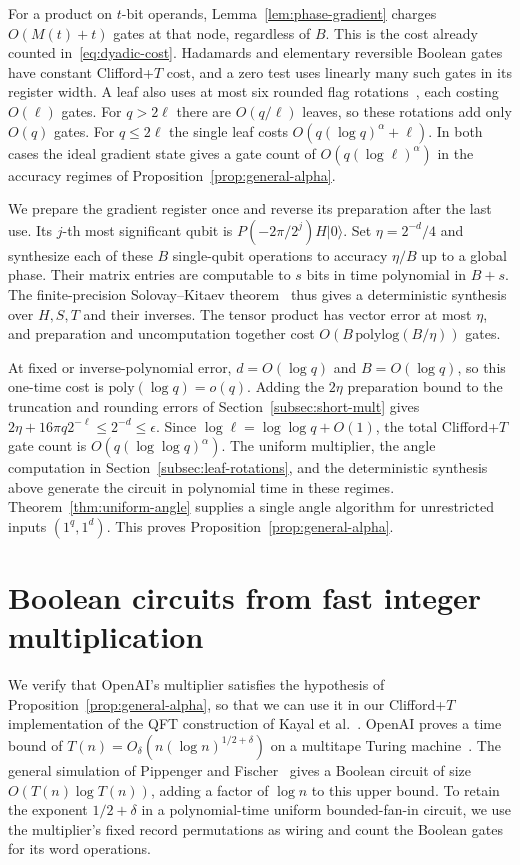 \documentclass[11pt]{article}
\newcommand{\CFT}{Clifford+$T$}
\begin{document}
For a product on $t$-bit operands, Lemma~\ref{lem:phase-gradient} charges $O(M(t)+t)$ gates at that node, regardless of $B$. This is the cost already counted in~\eqref{eq:dyadic-cost}. Hadamards and elementary reversible Boolean gates have constant \CFT{} cost, and a zero test uses linearly many such gates in its register width. A leaf also uses at most six rounded flag rotations~\cite[Section~4.2]{kmps2026}, each costing $O(\ell)$ gates. For $q>2\ell$ there are $O(q/\ell)$ leaves, so these rotations add only $O(q)$ gates. For $q\le 2\ell$ the single leaf costs $O(q(\log q)^\alpha+\ell)$. In both cases the ideal gradient state gives a gate count of $O(q(\log\ell)^\alpha)$ in the accuracy regimes of Proposition~\ref{prop:general-alpha}.

We prepare the gradient register once and reverse its preparation after the last use. Its $j$-th most significant qubit is $P(-2\pi/2^j)H|0\rangle$. Set $\eta=2^{-d}/4$ and synthesize each of these $B$ single-qubit operations to accuracy $\eta/B$ up to a global phase. Their matrix entries are computable to $s$ bits in time polynomial in $B+s$. The finite-precision Solovay--Kitaev theorem~\cite[Theorem~4.3]{vmw2012} thus gives a deterministic synthesis over $H,S,T$ and their inverses. The tensor product has vector error at most $\eta$, and preparation and uncomputation together cost $O(B\,\mathrm{polylog}(B/\eta))$ gates.

At fixed or inverse-polynomial error, $d=O(\log q)$ and $B=O(\log q)$, so this one-time cost is $\mathrm{poly}(\log q)=o(q)$. Adding the $2\eta$ preparation bound to the truncation and rounding errors of Section~\ref{subsec:short-mult} gives $2\eta+16\pi q2^{-\ell}\le 2^{-d}\le\epsilon$. Since $\log\ell=\log\log q+O(1)$, the total \CFT{} gate count is $O(q(\log\log q)^\alpha)$. The uniform multiplier, the angle computation in Section~\ref{subsec:leaf-rotations}, and the deterministic synthesis above generate the circuit in polynomial time in these regimes. Theorem~\ref{thm:uniform-angle} supplies a single angle algorithm for unrestricted inputs $(1^q,1^d)$. This proves Proposition~\ref{prop:general-alpha}.

\section{Boolean circuits from fast integer multiplication}\label{sec:boolean-mult}

We verify that OpenAI's multiplier satisfies the hypothesis of Proposition~\ref{prop:general-alpha}, so that we can use it in our \CFT{} implementation of the QFT construction of Kayal et al.~\cite{kmps2026}. OpenAI proves a time bound of $T(n)=O_\delta(n(\log n)^{1/2+\delta})$ on a multitape Turing machine~\cite[Theorem~5.1]{openai2026mult}. The general simulation of Pippenger and Fischer~\cite{pf1979} gives a Boolean circuit of size $O(T(n)\log T(n))$, adding a factor of $\log n$ to this upper bound. To retain the exponent $1/2+\delta$ in a polynomial-time uniform bounded-fan-in circuit, we use the multiplier's fixed record permutations as wiring and count the Boolean gates for its word operations.
\end{document}
